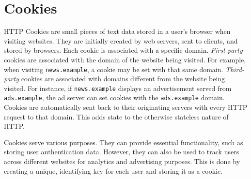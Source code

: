 \section{Cookies}
HTTP Cookies are small pieces of text data stored in a user's browser when visiting websites. 
They are initially created by web servers, sent to clients, and stored by browsers. 
Each cookie is associated with a specific domain.
\emph{First-party} cookies are associated with the domain of the website being visited.
For example, when visiting \texttt{news.example}, a cookie may be set with that same domain.
\emph{Third-party} cookies are associated with domains different from the website being visited. 
For instance, if \texttt{news.example} displays an advertisement served from \texttt{ads.example}, the ad server can set cookies with the \texttt{ads.example} domain.
Cookies are automatically sent back to their originating servers with every HTTP request to that domain. 
This adds state to the otherwise stateless nature of HTTP.

Cookies serve various purposes. 
They can provide essential functionality, such as storing user authentication data. 
However, they can also be used to track users across different websites for analytics and advertising purposes.
This is done by creating a unique, identifying key for each user and storing it as a cookie.

